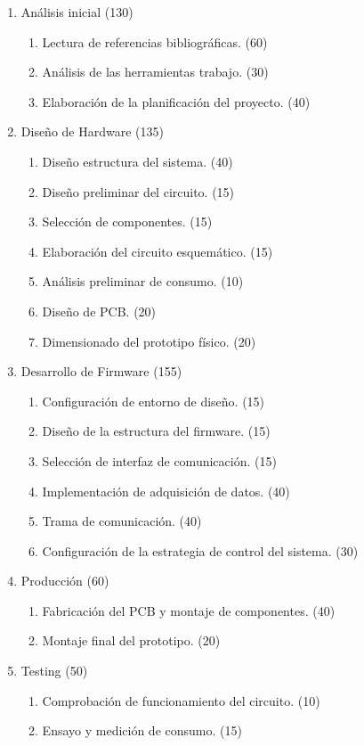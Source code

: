 \documentclass[11pt]{charter}
\begin{document}
\begin{enumerate}
\item Análisis inicial (130)
	\begin{enumerate}
	\item Lectura de referencias bibliográficas. (60)
	\item Análisis de las herramientas trabajo. (30)
	\item Elaboración de la planificación del proyecto. (40)
	\end{enumerate}
\item Diseño de Hardware (135)
	\begin{enumerate}
	\item Diseño estructura del sistema. (40)
	\item Diseño preliminar del circuito. (15)
	\item Selección de componentes. (15)
	\item Elaboración del circuito esquemático. (15)
	\item Análisis preliminar de consumo. (10)
	\item Diseño de PCB. (20)
	\item Dimensionado del prototipo físico. (20)
	\end{enumerate}
\item Desarrollo de Firmware (155)
	\begin{enumerate}
	\item Configuración de entorno de diseño. (15)
	\item Diseño de la estructura del firmware. (15)
	\item Selección de interfaz de comunicación. (15)
	\item Implementación de adquisición de datos. (40)
	\item Trama de comunicación. (40)
	\item Configuración de la estrategia de control del sistema. (30)
	\end{enumerate}
\item Producción (60)
	\begin{enumerate}
	\item Fabricación del PCB y montaje de componentes. (40)
	\item Montaje final del prototipo. (20)
	\end{enumerate}
\item Testing (50)
	\begin{enumerate}
	\item Comprobación de funcionamiento del circuito. (10)
	\item Ensayo y medición de consumo. (15)

\end{enumerate}
\end{enumerate}
\end{document}
